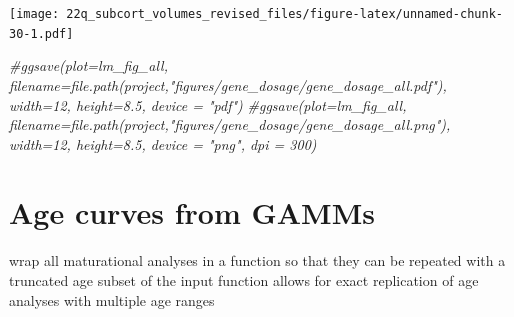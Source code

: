 \documentclass[
]{article}
\newenvironment{Shaded}{\begin{snugshade}}{\end{snugshade}}
\newcommand{\CommentTok}[1]{\textcolor[rgb]{0.56,0.35,0.01}{\textit{#1}}}
\begin{document}
\texttt{[image: 22q\_subcort\_volumes\_revised\_files/figure-latex/unnamed-chunk-30-1.pdf]}

\begin{Shaded}
\begin{Highlighting}[]
\CommentTok{\#ggsave(plot=lm\_fig\_all, filename=file.path(project,"figures/gene\_dosage/gene\_dosage\_all.pdf"), width=12, height=8.5, device = "pdf")}
\CommentTok{\#ggsave(plot=lm\_fig\_all, filename=file.path(project,"figures/gene\_dosage/gene\_dosage\_all.png"), width=12, height=8.5, device = "png", dpi = 300)}
\end{Highlighting}
\end{Shaded}

\hypertarget{age-curves-from-gamms}{%
\section{Age curves from GAMMs}\label{age-curves-from-gamms}}

wrap all maturational analyses in a function so that they can be
repeated with a truncated age subset of the input function allows for
exact replication of age analyses with multiple age ranges
\end{document}
